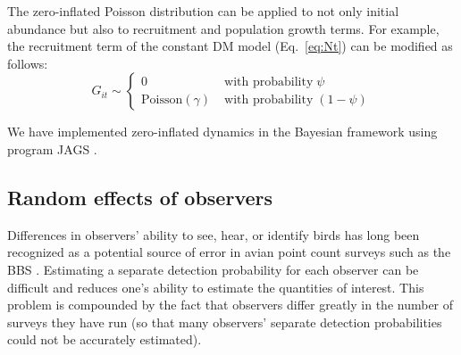 \documentclass[12pt]{article}
\begin{document}

The zero-inflated Poisson distribution can be applied to not only
initial abundance but also to recruitment and population growth terms.
For example, the recruitment term of the constant DM model 
(Eq.~\ref{eq:Nt}) can be modified as follows:
\begin{equation}
G_{it} \sim \left\{
\begin{aligned}
0 &\; \text{with probability} \; \psi \\
\mathrm{Poisson}(\gamma) &\; \text{with probability} \; (1-\psi)
\end{aligned} \right.
\label{eq:ZIPts}
\end{equation}

We have implemented
zero-inflated dynamics in the Bayesian framework using program
\textrm{JAGS} \citep[version 3.2.0]{plummer:2003}.


\subsection{Random effects of observers}

Differences in observers' ability to see, hear, or identify
birds has long been recognized as a potential source of error
in avian point count surveys such as the BBS
\citep{robbins_etal:1986,diefenbach_etal:2003,sauer_etal:1994auk,alldredge_etal:2007auk,campbell_francis:2011}.
Estimating a separate detection probability for each observer can be
difficult and reduces one's ability to estimate the quantities
of interest.  This problem is compounded by the fact that
observers differ greatly in the number of surveys they have
run (so that many observers' separate detection probabilities
could not be accurately estimated).
\end{document}
